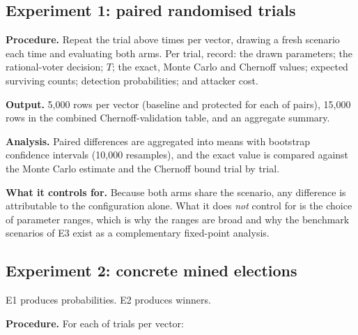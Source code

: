 \subsection{Experiment 1: paired randomised trials}
\label{sec:exp-one}

\textbf{Procedure.} Repeat the trial above \TotalTrials{} times per
vector, drawing a fresh scenario each time and evaluating both arms.
Per trial, record: the drawn parameters; the rational-voter decision;
$T$; the exact, Monte Carlo and Chernoff values; expected surviving
counts; detection probabilities; and attacker cost.

\textbf{Output.} 5{,}000 rows per vector (baseline and protected for
each of \TotalTrials{} pairs), 15{,}000 rows in the combined
Chernoff-validation table, and an aggregate summary.

\textbf{Analysis.} Paired differences are aggregated into means with
bootstrap confidence intervals (10{,}000 resamples), and the exact
value is compared against the Monte Carlo estimate and the Chernoff
bound trial by trial.

\textbf{What it controls for.} Because both arms share the scenario, any
difference is attributable to the configuration alone. What it does
\emph{not} control for is the choice of parameter ranges, which is why
the ranges are broad and why the benchmark scenarios of E3 exist as a
complementary fixed-point analysis.

\subsection{Experiment 2: concrete mined elections}
\label{sec:exp-two}

E1 produces probabilities. E2 produces winners.

\textbf{Procedure.} For each of \ElectionTrials{} trials per vector:

